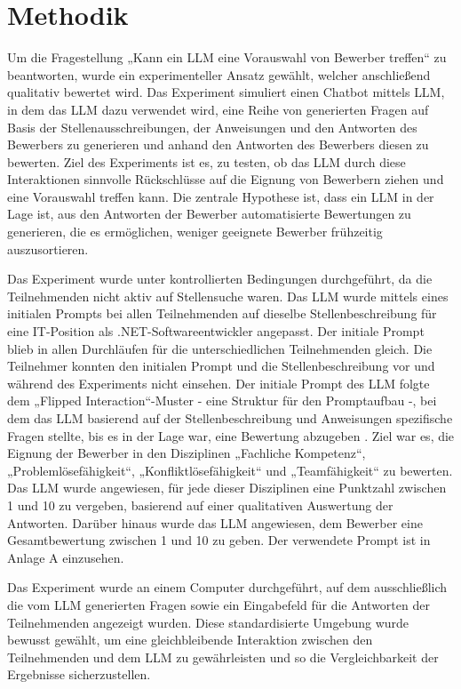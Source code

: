 
\chapter{Methodik}

Um die Fragestellung „Kann ein \acs{LLM} eine Vorauswahl von Bewerber treffen“ zu beantworten, 
wurde ein experimenteller Ansatz gewählt, welcher anschließend qualitativ bewertet wird. 
Das Experiment simuliert einen Chatbot mittels \acs{LLM}, in dem das \acs{LLM} dazu verwendet wird, 
eine Reihe von generierten Fragen auf Basis der Stellenausschreibungen,
der Anweisungen und den Antworten des Bewerbers zu generieren und anhand den Antworten des Bewerbers 
diesen zu bewerten. Ziel des Experiments ist es, zu testen, ob das \acs{LLM} durch diese Interaktionen 
sinnvolle Rückschlüsse auf die Eignung von Bewerbern ziehen und eine Vorauswahl treffen kann. 
Die zentrale Hypothese ist, dass ein \acs{LLM} in der Lage ist, aus den Antworten der Bewerber automatisierte Bewertungen zu generieren, die es ermöglichen, weniger geeignete 
Bewerber frühzeitig auszusortieren. 


Das Experiment wurde unter kontrollierten Bedingungen durchgeführt, da die Teilnehmenden nicht aktiv auf Stellensuche waren. 
Das \acs{LLM} wurde mittels eines initialen Prompts bei allen Teilnehmenden auf dieselbe Stellenbeschreibung 
für eine IT-Position als .NET-Softwareentwickler angepasst. Der initiale Prompt blieb in allen 
Durchläufen für die unterschiedlichen Teilnehmenden gleich. Die Teilnehmer konnten den initialen Prompt und die Stellenbeschreibung vor und während 
des Experiments nicht einsehen. 
Der initiale Prompt des \acs{LLM} folgte dem „Flipped Interaction“-Muster - eine Struktur für den Promptaufbau -, bei dem das \acs{LLM} basierend 
auf der Stellenbeschreibung und Anweisungen spezifische Fragen stellte, bis es in der Lage war, 
eine Bewertung abzugeben \cite{white2023promptpatterncatalogenhance}. Ziel war es, die Eignung der Bewerber in den Disziplinen 
„Fachliche Kompetenz“, „Problemlösefähigkeit“, „Konfliktlösefähigkeit“ und „Teamfähigkeit“ zu 
bewerten. Das \acs{LLM} wurde angewiesen, für jede dieser Disziplinen eine Punktzahl zwischen 1 und 10 
zu vergeben, basierend auf einer qualitativen Auswertung der Antworten. Darüber hinaus wurde das \acs{LLM} 
angewiesen, dem Bewerber eine Gesamtbewertung zwischen 1 und 10 zu geben. Der verwendete Prompt 
ist in Anlage A einzusehen. 


Das Experiment wurde an einem Computer durchgeführt, auf dem ausschließlich die vom \acs{LLM} 
generierten Fragen sowie ein Eingabefeld für die Antworten der Teilnehmenden angezeigt wurden. 
Diese standardisierte Umgebung wurde bewusst gewählt, um eine gleichbleibende Interaktion zwischen 
den Teilnehmenden und dem \acs{LLM} zu gewährleisten und so die Vergleichbarkeit der Ergebnisse 
sicherzustellen. 



